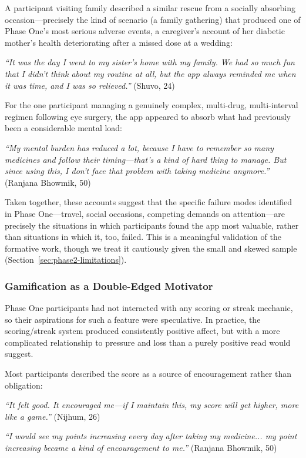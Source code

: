 \documentclass[acmlarge]{acmart}
\begin{document}
A participant visiting family described a similar rescue from a socially
absorbing occasion---precisely the kind of scenario (a family gathering) that
produced one of Phase One's most serious adverse events, a caregiver's
account of her diabetic mother's health deteriorating after a missed dose
at a wedding:

\emph{``It was the day I went to my sister's home with my family. We had
so much fun that I didn't think about my routine at all, but the app always
reminded me when it was time, and I was so relieved.''} (Shuvo, 24)

For the one participant managing a genuinely complex, multi-drug,
multi-interval regimen following eye surgery, the app appeared to absorb
what had previously been a considerable mental load:

\emph{``My mental burden has reduced a lot, because I have to remember so
many medicines and follow their timing---that's a kind of hard thing to
manage. But since using this, I don't face that problem with taking
medicine anymore.''} (Ranjana Bhowmik, 50)

Taken together, these accounts suggest that the specific failure modes
identified in Phase One---travel, social occasions, competing demands on
attention---are precisely the situations in which participants found the
app most valuable, rather than situations in which it, too, failed. This is
a meaningful validation of the formative work, though we treat it
cautiously given the small and skewed sample (Section~\ref{sec:phase2-limitations}).

\subsubsection{Gamification as a Double-Edged Motivator}
Phase One participants had not interacted with any scoring or streak
mechanic, so their aspirations for such a feature were speculative. In
practice, the scoring/streak system produced consistently positive affect,
but with a more complicated relationship to pressure and loss than a purely
positive read would suggest.

Most participants described the score as a source of encouragement rather
than obligation:

\emph{``It felt good. It encouraged me---if I maintain this, my score will
get higher, more like a game.''} (Nijhum, 26)

\emph{``I would see my points increasing every day after taking my
medicine... my point increasing became a kind of encouragement to
me.''} (Ranjana Bhowmik, 50)
\end{document}
